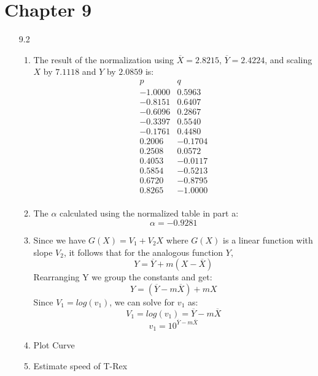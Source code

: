 \documentclass[11pt,a4paper]{article}
\begin{document}
	\section{Chapter 9}
		\begin{itemize}
			\item[9.2]
				\begin{enumerate} [label={\alph*)}]
					\item The result of the normalization using $\overline{X}=2.8215$, $\overline{Y}=2.4224$, and scaling $X$ by $7.1118$ and $Y$ by $2.0859$ is:
						$$\begin{array}{cc}
							p & q \\ \hline
							-1.0000  & 0.5963 \\
							-0.8151  & 0.6407 \\
							-0.6096  & 0.2867 \\
							-0.3397  & 0.5540 \\
							-0.1761  & 0.4480 \\
							0.2006 & -0.1704 \\
							0.2508  & 0.0572 \\
							0.4053   & -0.0117 \\
							0.5854  & -0.5213 \\
							0.6720  & -0.8795 \\
							0.8265  & -1.0000 \\
							
						
						\end{array}$$
					\item The $\alpha$ calculated using the normalized table in part a: $$\alpha = -0.9281$$
					\item Since we have $G(X)=V_1 + V_2 X$ where $G(X)$ is a linear function with slope $V_2$, it follows that for the analogous function $Y$,
					$$Y=\overline{Y} + m(X-\overline{X})$$
					Rearranging Y we group the constants and get:
					$$Y=(\overline{Y}-m\overline{X})+mX$$ Since $V_1=log(v_1)$, we can solve for $v_1$ as:
					$$V_1= log(v_1)=\overline{Y}-m\overline{X}$$
					$$v_1=10^{\overline{Y}-m\overline{X}}$$
					\item Plot Curve
					\item Estimate speed of T-Rex
				\end{enumerate}
					

\end{itemize}
\end{document}
